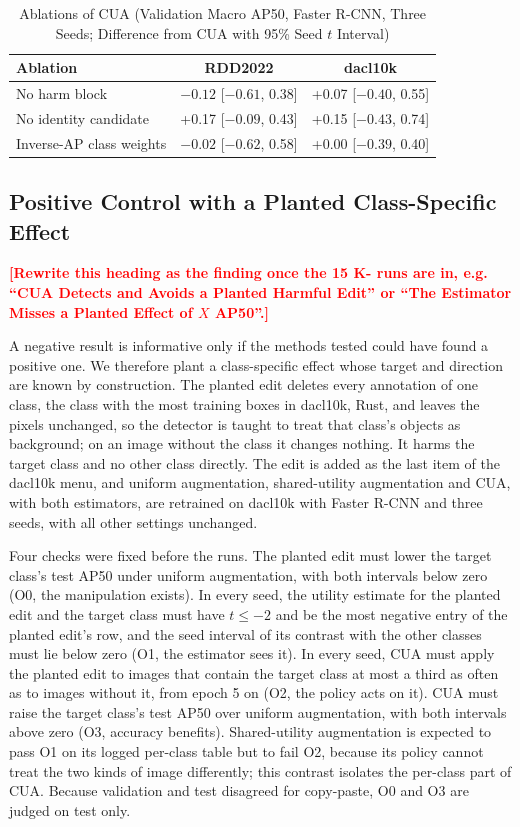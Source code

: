 \documentclass[conference]{IEEEtran}
\newcommand{\todo}[1]{\textcolor{red}{\textbf{[#1]}}}
\begin{document}
\begin{table}[t]
\caption{Ablations of CUA (Validation Macro AP50, Faster R-CNN, Three Seeds; Difference from CUA with 95\% Seed $t$ Interval)}
\label{tab:ablations}
\centering
\footnotesize
\setlength{\tabcolsep}{3pt}
\begin{tabular}{@{}lcc@{}}
\toprule
\textbf{Ablation} & \textbf{RDD2022} & \textbf{dacl10k} \\
\midrule
No harm block & $-0.12$ [$-0.61$, 0.38] & +0.07 [$-0.40$, 0.55] \\
No identity candidate & +0.17 [$-0.09$, 0.43] & +0.15 [$-0.43$, 0.74] \\
Inverse-AP class weights & $-0.02$ [$-0.62$, 0.58] & +0.00 [$-0.39$, 0.40] \\
\bottomrule
\end{tabular}
\end{table}

\subsection{Positive Control with a Planted Class-Specific Effect}
\label{sec:results_control}

\todo{Rewrite this heading as the finding once the 15 K- runs are in, e.g. ``CUA Detects and Avoids a Planted Harmful Edit'' or ``The Estimator Misses a Planted Effect of $X$ AP50''.}

A negative result is informative only if the methods tested could have found a positive one. We therefore plant a class-specific effect whose target and direction are known by construction. The planted edit deletes every annotation of one class, the class with the most training boxes in dacl10k, Rust, and leaves the pixels unchanged, so the detector is taught to treat that class's objects as background; on an image without the class it changes nothing. It harms the target class and no other class directly. The edit is added as the last item of the dacl10k menu, and uniform augmentation, shared-utility augmentation and CUA, with both estimators, are retrained on dacl10k with Faster R-CNN and three seeds, with all other settings unchanged.

Four checks were fixed before the runs. The planted edit must lower the target class's test AP50 under uniform augmentation, with both intervals below zero (O0, the manipulation exists). In every seed, the utility estimate for the planted edit and the target class must have $t\leq-2$ and be the most negative entry of the planted edit's row, and the seed interval of its contrast with the other classes must lie below zero (O1, the estimator sees it). In every seed, CUA must apply the planted edit to images that contain the target class at most a third as often as to images without it, from epoch 5 on (O2, the policy acts on it). CUA must raise the target class's test AP50 over uniform augmentation, with both intervals above zero (O3, accuracy benefits). Shared-utility augmentation is expected to pass O1 on its logged per-class table but to fail O2, because its policy cannot treat the two kinds of image differently; this contrast isolates the per-class part of CUA. Because validation and test disagreed for copy-paste, O0 and O3 are judged on test only.
\end{document}
